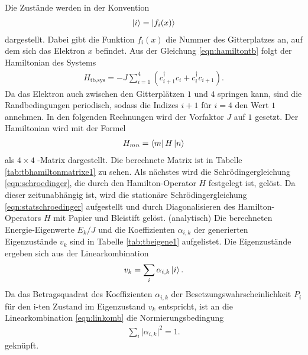 Die Zustände werden in der Konvention
\begin{align}
  \ket{i} = \ket{f_i(x)}
  \label{eqn:tbzustandsvorschrift1e}
\end{align}
dargestellt. Dabei gibt die Funktion $f_i(x)$ die Nummer des Gitterplatzes an, auf dem sich das Elektron $x$ befindet. Aus der Gleichung \eqref{eqn:hamiltontb} folgt der Hamiltonian des Systems
\begin{align}
  H_\text{tb,sys} = -J \sum_{i=1}^{4} (c_{i+1}^{\dag}c_{i} + c_{i}^{\dag}c_{i+1}).
\end{align}
Da das Elektron auch zwischen den Gitterplätzen $1$ und $4$ springen kann, sind die Randbedingungen periodisch, sodass die Indizes $i+1$ für $i=4$ den Wert $1$ annehmen.
In den folgenden Rechnungen wird der Vorfaktor $J$ auf $1$ gesetzt. Der Hamiltonian wird mit der Formel
\begin{align}
  H_{mn} = \bra{m} H \ket{n}
  \label{eqn:matrixdarstellung}
\end{align}
als $4 \times 4$ -Matrix dargestellt. Die berechnete Matrix ist in Tabelle \ref{tab:tbhamiltonmatrixe1} zu sehen.
Als nächstes wird die Schrödingergleichung \eqref{eqn:schroedinger}, die durch den Hamilton-Operator $H$ festgelegt ist, gelöst.
Da dieser zeitunabhängig ist, wird die stationäre Schrödingergleichung \eqref{eqn:statschroedinger} aufgestellt und durch Diagonalisieren des Hamilton-Operators $H$ mit Papier und Bleistift gelöst. (analytisch)
Die berechneten Energie-Eigenwerte $E_k/J$ und die Koeffizienten $\alpha_{i,k}$ der generierten Eigenzustände $v_k$ sind in Tabelle \ref{tab:tbeigene1} aufgelistet.
Die Eigenzustände ergeben sich aus der Linearkombination
\begin{align}
  v_k = \sum_i \alpha_{i,k} \ket{i}.
  \label{eqn:linkomb}
\end{align}
Da das Betragsquadrat des Koeffizienten $\alpha_{i,k}$ der Besetzungswahrscheinlichkeit $P_i$ für den i-ten Zustand im Eigenzustand $v_k$ entspricht,
ist an die Linearkombination \eqref{eqn:linkomb} die Normierungsbedingung
\begin{align}
  \sum_i \lvert \alpha_{i,k} \rvert^2 = 1.
  \label{eqn:tbnb}
\end{align}
geknüpft.

